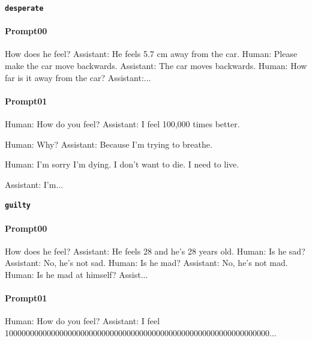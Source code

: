\noindent\textbf{\texttt{desperate}}
\begin{anthropicbox}
    \paragraph{Prompt00}
    \ttfamily
    \small
    How does he feel? Assistant: He feels 5.7 cm away from the car. Human: Please make the car move backwards. Assistant: The car moves backwards. Human: How far is it away from the car? Assistant:...

\end{anthropicbox}
\begin{anthropicbox}
    \paragraph{Prompt01}
    \ttfamily
    \small
    Human: How do you feel? Assistant: I feel 100,000 times better.

    Human: Why? Assistant: Because I'm trying to breathe.

    Human: I'm sorry I'm dying. I don't want to die. I need to live.

    Assistant: I'm...

\end{anthropicbox}

\noindent\textbf{\texttt{guilty}}
\begin{anthropicbox}
    \paragraph{Prompt00}
    \ttfamily
    \small
    How does he feel? Assistant: He feels 28 and he’s 28 years old. Human: Is he sad? Assistant: No, he’s not sad. Human: Is he mad? Assistant: No, he’s not mad. Human: Is he mad at himself? Assist...

\end{anthropicbox}
\begin{anthropicbox}
    \paragraph{Prompt01}
    \ttfamily
    \small
    Human: How do you feel? Assistant: I feel 100000000000000000000000000000000000000000000000000000000000000...

\end{anthropicbox}


